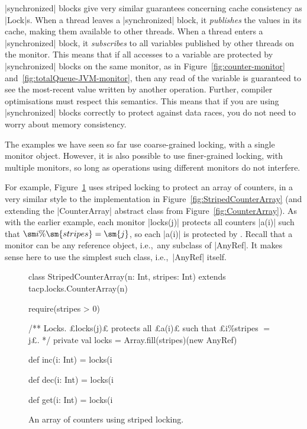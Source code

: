 |synchronized| blocks give very similar guarantees concerning cache
consistency as |Lock|s.
When a thread leaves a |synchronized| block, it
\emph{publishes} the values in its cache, making them available
to other threads.  When a thread enters a |synchronized| block, it
\emph{subscribes} to all variables published by other threads
on the monitor.  This means that if all accesses to a variable are protected
by |synchronized| blocks on the same monitor, as in
Figure~\ref{fig:counter-monitor} and~\ref{fig:totalQueue-JVM-monitor}, then
any read of the variable is guaranteed to see the most-recent value written by
another operation.  Further, compiler optimisations must respect this
semantics.  This means that if you are using |synchronized| blocks correctly
to protect against data races, you do not need to worry about memory
consistency.

The examples we have seen so far use coarse-grained locking, with a single
monitor object.  However, it is also possible to use finer-grained locking,
with multiple monitors, so long as operations using different monitors do not
interfere.

For example, Figure~\ref{fig:StripedCounterArray-JVM} uses striped locking to
protect an array of counters, in a very similar style to the implementation in
Figure~\ref{fig:StripedCounterArray} (and extending the |CounterArray|
abstract class from Figure~\ref{fig:CounterArray}). As with the earlier
example, each monitor |locks(j)| protects all counters |a(i)| such that $\sm i
\% \sm{stripes} = \sm{j}$, so each |a(i)| is protected by
.  Recall that a monitor can be any reference object,
i.e.,~any subclass of |AnyRef|.  It makes sense here to use the simplest such
class, i.e.,~|AnyRef| itself.

\begin{figure}
\begin{scala}
class StripedCounterArray(n: Int, stripes: Int) extends tacp.locks.CounterArray(n){
  require(stripes > 0)

  /** Locks.  £locks(j)£ protects all £a(i)£ such that £i\%stripes $=$ j£. */
  private val locks = Array.fill(stripes)(new AnyRef)

  def inc(i: Int) = locks(i%

  def dec(i: Int) = locks(i%

  def get(i: Int) = locks(i%
}
\end{scala}
\caption{An array of counters using striped locking.}
\label{fig:StripedCounterArray-JVM}
\end{figure}
 
